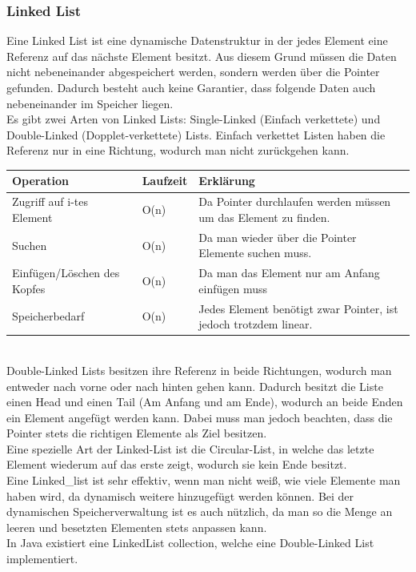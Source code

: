 \documentclass{article}
\begin{document}
	\subsubsection{Linked List}
	Eine Linked List ist eine dynamische Datenstruktur in der jedes Element eine Referenz auf das nächste Element besitzt. Aus diesem Grund müssen die Daten nicht nebeneinander abgespeichert werden, sondern werden über die Pointer gefunden. Dadurch besteht auch keine Garantier, dass folgende Daten auch nebeneinander im Speicher liegen. \\
	Es gibt zwei Arten von Linked Lists: Single-Linked (Einfach verkettete) und Double-Linked (Dopplet-verkettete) Lists. Einfach verkettet Listen haben die Referenz nur in eine Richtung, wodurch man nicht zurückgehen kann. \\
	\begin{tabular}{| l | l | l |}
		\toprule
		Operation & Laufzeit & Erklärung \\ \midrule
		Zugriff auf i-tes Element & O(n) & Da Pointer durchlaufen werden müssen um das Element zu finden. \\ \hline
		Suchen & O(n) & Da man wieder über die Pointer Elemente suchen muss. \\ \hline
		Einfügen/Löschen des Kopfes & O(n) & Da man das Element nur am Anfang einfügen muss \\ \hline
		Speicherbedarf & O(n) & Jedes Element benötigt zwar Pointer, ist jedoch trotzdem linear.\\
		\bottomrule
	\end{tabular} \\
	Double-Linked Lists besitzen ihre Referenz in beide Richtungen, wodurch man entweder nach vorne oder nach hinten gehen kann. Dadurch besitzt die Liste einen Head und einen Tail (Am Anfang und am Ende), wodurch an beide Enden ein Element angefügt werden kann. Dabei muss man jedoch beachten, dass die Pointer stets die richtigen Elemente als Ziel besitzen. \\
	Eine spezielle Art der Linked-List ist die Circular-List, in welche das letzte Element wiederum auf das erste zeigt, wodurch sie kein Ende besitzt. \\
	Eine Linked_list ist sehr effektiv, wenn man nicht weiß, wie viele Elemente man haben wird, da dynamisch weitere hinzugefügt werden können. Bei der dynamischen Speicherverwaltung ist es auch nützlich, da man so die Menge an leeren und besetzten Elementen stets anpassen kann. \\
	In Java existiert eine LinkedList collection, welche eine Double-Linked List implementiert.


	
	
	
	























	
\end{document}
